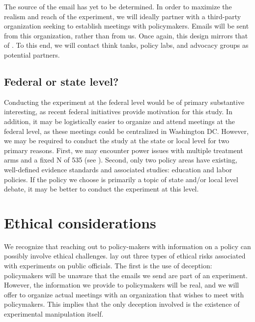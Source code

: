 \documentclass[12pt,final,fleqn]{article}
\theoremstyle{plain}
\begin{document}
The source of the email has yet to be determined. In order to maximize the realism and reach of the experiment, we will ideally partner with a third-party organization seeking to establish meetings with policymakers. Emails will be sent from this organization, rather than from us. Once again, this design mirrors that of \citet{kalla2016campaign}. To this end, we will contact think tanks, policy labs, and advocacy groups as potential partners. 


\subsection{Federal or state level?} \label{sec: Level}

Conducting the experiment at the federal level would be of primary substantive interesting, as recent federal initiatives provide motivation for this study. In addition, it may be logistically easier to organize and attend meetings at the federal level, as these meetings could be centralized in Washington DC. However, we may be required to conduct the study at the state or local level for two primary reasons. First, we may encounter power issues with multiple treatment arms and a fixed N of 535 (see ). Second, only two policy areas have existing, well-defined evidence standards and associated studies: education and labor policies. If the policy we choose is primarily a topic of state and/or local level debate, it may be better to conduct the experiment at this level. 


\section{Ethical considerations} \label{sec:Ethics}

We recognize that reaching out to policy-makers with information on a policy can possibly involve ethical challenges. \citet{butler2011politicians} lay out three types of ethical risks associated with experiments on public officials. The first is the use of deception: policymakers will be unaware that the emails we send are part of an experiment. However, the information we provide to policymakers will be real, and we will offer to organize actual meetings with an organization that wishes to meet with policymakers. This implies that the only deception involved is the existence of experimental manipulation itself.
\end{document}
